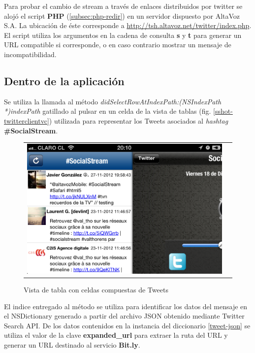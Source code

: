 Para probar el cambio de stream a través de enlaces distribuidos por twitter se alojó el script \textbf{PHP} (\ref{subsec:php-redir}) en un servidor dispuesto por AltaVoz S.A. La ubicación de éste corresponde a \url{http://tsh.altavoz.net/twitter/index.php}.
El script utiliza los argumentos en la cadena de consulta \textbf{s} y \textbf{t} para generar un URL compatible si corresponde, o en caso contrario mostrar un mensaje de incompatibilidad.
  \subsection{Dentro de la aplicación}
  \label{subsec:ts-inside}
Se utiliza la llamada al método \textit{didSelectRowAtIndexPath:(NSIndexPath *)indexPath} gatillado al pulsar en un celda de la vista de tablas (fig. \ref{sshot-twitterclientvc}) utilizada para representar los Tweets asociados al \textit{hashtag} \textbf{\#SocialStream}. \\

\begin{figure}[H]
	\centering
	\begin{tabular}{cc}
	\includegraphics[scale=0.3]{imgs/twclient-list.png}
	\end{tabular}
	\caption{Vista de tabla con celdas compuestas de Tweets}
	\label{fig:twclient-list}
\end{figure}

El indice entregado al método se utiliza para identificar los datos del mensaje en el NSDictionary generado a partir del archivo JSON obtenido mediante Twitter Search API. De los datos contenidos en la instancia del diccionario \ref{tweet-json} se utiliza el valor de la clave \textbf{expanded\_url} para extraer la ruta del URL y generar un URL destinado al servicio \textbf{Bit.ly}.  \\

